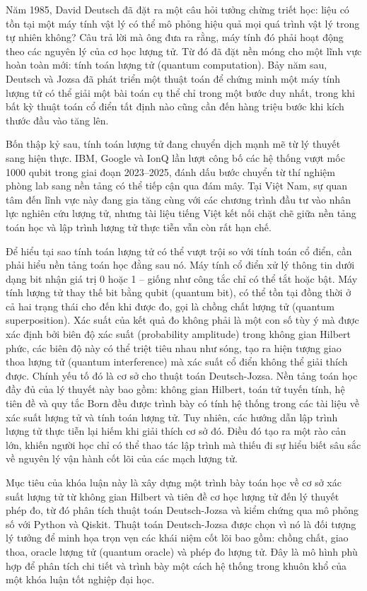 Năm 1985, David Deutsch đã đặt ra một câu hỏi tưởng chừng triết học: liệu có tồn tại một máy tính vật lý có thể mô phỏng hiệu quả mọi quá trình vật lý trong tự nhiên không? Câu trả lời mà ông đưa ra rằng, máy tính đó phải hoạt động theo các nguyên lý của cơ học lượng tử. Từ đó đã đặt nền móng cho một lĩnh vực hoàn toàn mới: tính toán lượng tử (quantum computation). Bảy năm sau, Deutsch và Jozsa đã phát triển một thuật toán để chứng minh một máy tính lượng tử có thể giải một bài toán cụ thể chỉ trong một bước duy nhất, trong khi bất kỳ thuật toán cổ điển tất định nào cũng cần đến hàng triệu bước khi kích thước đầu vào tăng lên.

Bốn thập kỷ sau, tính toán lượng tử đang chuyển dịch mạnh mẽ từ lý thuyết sang hiện thực. IBM, Google và IonQ lần lượt công bố các hệ thống vượt mốc 1000 qubit trong giai đoạn 2023–2025, đánh dấu bước chuyển từ thí nghiệm phòng lab sang nền tảng có thể tiếp cận qua đám mây. Tại Việt Nam, sự quan tâm đến lĩnh vực này đang gia tăng cùng với các chương trình đầu tư vào nhân lực nghiên cứu lượng tử, nhưng tài liệu tiếng Việt kết nối chặt chẽ giữa nền tảng toán học và lập trình lượng tử thực tiễn vẫn còn rất hạn chế.

Để hiểu tại sao tính toán lượng tử có thể vượt trội so với tính toán cổ điển, cần phải hiểu nền tảng toán học đằng sau nó. Máy tính cổ điển xử lý thông tin dưới dạng bit nhận giá trị 0 hoặc 1 -- giống như công tắc chỉ có thể tắt hoặc bật. Máy tính lượng tử thay thế bit bằng qubit (quantum bit), có thể tồn tại đồng thời ở cả hai trạng thái cho đến khi được đo, gọi là chồng chất lượng tử (quantum superposition). Xác suất của kết quả đo không phải là một con số tùy ý mà được xác định bởi biên độ xác suất (probability amplitude) trong không gian Hilbert phức, các biên độ này có thể triệt tiêu nhau như sóng, tạo ra hiện tượng giao thoa lượng tử (quantum interference) mà xác suất cổ điển không thể giải thích được. Chính yếu tố đó là cơ sở cho thuật toán Deutsch-Jozsa. Nền tảng toán học đầy đủ của lý thuyết này bao gồm: không gian Hilbert, toán tử tuyến tính, hệ tiên đề và quy tắc Born đều được trình bày có tính hệ thống trong các tài liệu về xác suất lượng tử và tính toán lượng tử. Tuy nhiên, các hướng dẫn lập trình lượng tử thực tiễn lại hiếm khi giải thích cơ sở đó. Điều đó tạo ra một rào cản lớn, khiến người học chỉ có thể thao tác lập trình mà thiếu đi sự hiểu biết sâu sắc về nguyên lý vận hành cốt lõi của các mạch lượng tử.

Mục tiêu của khóa luận này là xây dựng một trình bày toán học về cơ sở xác suất lượng tử từ không gian Hilbert và tiên đề cơ học lượng tử đến lý thuyết phép đo,  từ đó phân tích thuật toán Deutsch-Jozsa và kiểm chứng qua mô phỏng số với Python và Qiskit. Thuật toán Deutsch-Jozsa được chọn vì nó là đối tượng lý tưởng để minh họa trọn vẹn các khái niệm cốt lõi bao gồm: chồng chất, giao thoa, oracle lượng tử (quantum oracle) và phép đo lượng tử. Đây là mô hình phù hợp để phân tích chi tiết và trình bày một cách hệ thống trong khuôn khổ của một khóa luận tốt nghiệp đại học.

